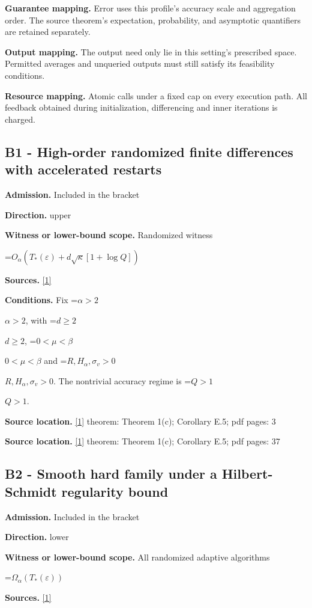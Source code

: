 \documentclass[10pt,a4paper]{article}
\newcommand{\AtlasMath}[1]{\par\begingroup\centering\setbox0=\hbox{$\displaystyle #1$}\ifdim\wd0>1.4\linewidth\typeout{ATLAS WIDE FORMULA: \the\wd0}\fi\ifdim\wd0>\linewidth\resizebox{\linewidth}{!}{\box0}\else\box0\fi\par\endgroup}
\newcommand{\AtlasInlineMath}[1]{\begingroup\setbox0=\hbox{$#1$}\ifdim\wd0>.4\linewidth\endgroup\AtlasMath{#1}\else\endgroup$#1$\fi}
\begin{document}
\textbf{Guarantee mapping.} Error uses this profile's accuracy scale and aggregation order. The source theorem's expectation, probability, and asymptotic quantifiers are retained separately.

\textbf{Output mapping.} The output need only lie in this setting's prescribed space. Permitted averages and unqueried outputs must still satisfy its feasibility conditions.

\textbf{Resource mapping.} Atomic calls under a fixed cap on every execution path. All feedback obtained during initialization, differencing and inner iterations is charged.

\subsection{B1 - High-order randomized finite differences with accelerated restarts}
\textbf{Admission.} Included in the bracket

\textbf{Direction.} upper

\textbf{Witness or lower-bound scope.} Randomized witness

\AtlasMath{O_\alpha(T_*(\varepsilon)+d\sqrt\kappa[1+\log Q])}
\textbf{Sources.} \href{https://arxiv.org/pdf/2610.05517v2}{[1]}

\textbf{Conditions.} Fix \AtlasInlineMath{\alpha>2}, with \AtlasInlineMath{d\ge2}, \AtlasInlineMath{0<\mu<\beta} and \AtlasInlineMath{R,H_\alpha,\sigma_v>0}. The nontrivial accuracy regime is \AtlasInlineMath{Q>1}.

\textbf{Source location.} \href{https://arxiv.org/pdf/2610.05517v2}{[1]} theorem: Theorem 1(c); Corollary E.5; pdf pages: 3

\textbf{Source location.} \href{https://arxiv.org/pdf/2610.05517v2}{[1]} theorem: Theorem 1(c); Corollary E.5; pdf pages: 37

\subsection{B2 - Smooth hard family under a Hilbert-Schmidt regularity bound}
\textbf{Admission.} Included in the bracket

\textbf{Direction.} lower

\textbf{Witness or lower-bound scope.} All randomized adaptive algorithms

\AtlasMath{\Omega_\alpha(T_*(\varepsilon))}
\textbf{Sources.} \href{https://arxiv.org/pdf/2610.05517v2}{[1]}
\end{document}
